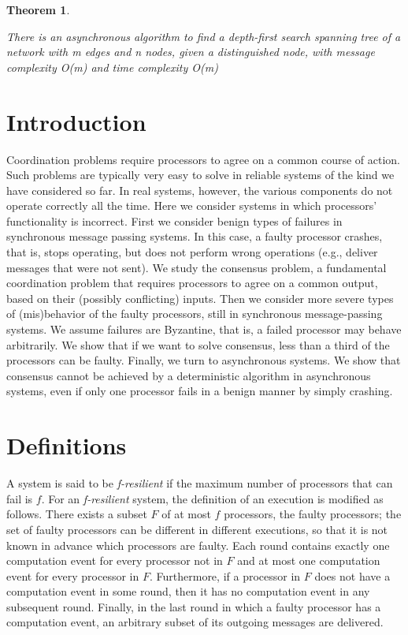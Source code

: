\documentclass{article}
\newtheorem{thm}{Theorem}[section]
\newenvironment{theorem}{\begin{thm}\begin{rm}}%
{\end{rm}\end{thm}}
\begin{document}
\begin{theorem}
There is an asynchronous algorithm to find a depth-first search spanning tree of a network with m edges and n nodes, given a distinguished node, with 
message complexity O(m) and time complexity O(m)
\end{theorem}
\section{Introduction}
Coordination problems require processors to agree on a common course of action. Such problems are typically very easy to solve in reliable systems of the kind we have considered so far. In real systems, however, the various components do not operate correctly all the time. Here we consider systems in which processors' functionality is incorrect. First we consider benign types of failures in synchronous message passing systems. In this case, a faulty processor crashes, that is, stops operating, but does not perform wrong operations (e.g., deliver messages that were not sent). We study the consensus problem, a fundamental coordination problem that requires processors to agree on a common output, based on their (possibly conflicting) inputs. Then we consider more severe types of (mis)behavior of the faulty processors, still in synchronous message-passing systems. We assume failures are Byzantine, that is, a failed processor may behave arbitrarily. We show that if we want to solve consensus, less than a third of the processors can be faulty. Finally, we turn to asynchronous systems. We show that consensus cannot be achieved by a deterministic algorithm in asynchronous systems, even if only one processor fails in a benign manner by simply crashing. 

\section{Definitions}
A system is said to be \textit{f-resilient }if the maximum number of processors that can fail is $f$.
For an \textit{f-resilient} system, the definition of an execution is modified as follows. There exists a subset $F$ of at most $f$ processors, the faulty processors; the set of faulty processors can be different in different executions, so that it is not known in advance which processors are faulty. Each round contains exactly one computation event for every processor not in $F$ and at most one computation event for every processor in $F$. Furthermore, if a processor in $F$ does not have a computation event in some round, then it has no computation event in any subsequent round. Finally, in the last round in which a faulty processor has a computation event, an arbitrary subset of its outgoing messages are delivered.
\end{document}
